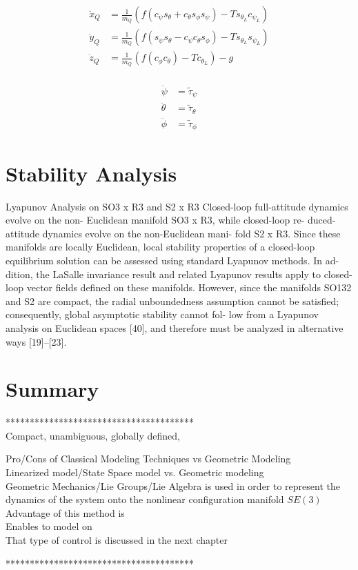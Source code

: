 \begin{equation}\label{key}
\begin{aligned}
\ddot{x}_Q&=\frac{1}{m_Q}(f(c_{\psi}s_{\theta}+c_{\theta}s_{\phi}s_{\psi})-Ts_{\theta_L}c_{\psi_L})\\
\ddot{y}_Q&=\frac{1}{m_Q}(f(s_{\psi}s_{\theta}-c_{\psi}c_{\theta}s_{\phi})-Ts_{\theta_L}s_{\psi_L})\\
\ddot{z}_Q&=\frac{1}{m_Q}(f(c_{\phi}c_{\theta})-Tc_{\theta_L})-g\\
\end{aligned}
\end{equation}

\begin{align}\label{key}
	\ddot{\psi}&=\tilde{\tau}_{\psi}\\
\ddot{\theta}&=\tilde{\tau}_{\theta}\\
\ddot{\phi} &=\tilde{\tau}_{\phi}
\end{align}

\section{Stability Analysis}
Lyapunov Analysis on SO3 x R3 and S2 x R3
Closed-loop full-attitude dynamics evolve on the non- Euclidean manifold SO3 x R3, while closed-loop re-
duced-attitude dynamics evolve on the non-Euclidean mani- fold S2 x R3. Since these manifolds are locally Euclidean, local stability properties of a closed-loop equilibrium solution can be assessed using standard Lyapunov methods. In ad- dition, the LaSalle invariance result and related Lyapunov results apply to closed-loop vector fields defined on these
manifolds. However, since the manifolds SO132 and S2 are compact, the radial unboundedness assumption cannot be satisfied; consequently, global asymptotic stability cannot fol- low from a Lyapunov analysis on Euclidean spaces [40], and therefore must be analyzed in alternative ways [19]–[23].\cite[p.43]{Chaturvedi2011}

\section{Summary}

***************************************\\
Compact, unambiguous, globally defined, 

Pro/Cons of Classical Modeling Techniques vs Geometric Modeling\\

Linearized model/State Space model vs. Geometric modeling\\


Geometric Mechanics/Lie Groups/Lie Algebra is used in order to represent the dynamics of the system onto the nonlinear configuration manifold $ SE(3) $\\
Advantage of this method is\\
Enables to model on \\
That type of control is discussed in the next chapter


***************************************\\